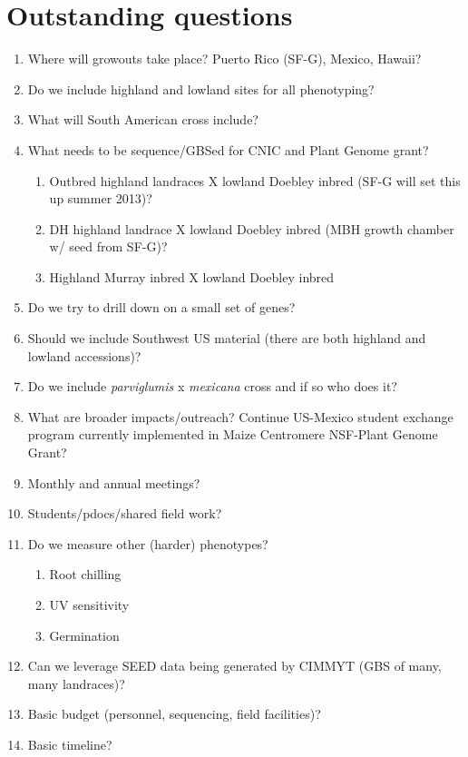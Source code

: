 \documentclass[]{article}
\begin{document}
\section*{Outstanding questions}
\begin{enumerate}
	\item Where will growouts take place?  Puerto Rico (SF-G), Mexico, Hawaii?
	\item Do we include highland and lowland sites for all phenotyping?
	\item What will South American cross include? 
	\item What needs to be sequence/GBSed for CNIC and Plant Genome grant? 
	\begin{enumerate}
		\item Outbred highland landraces X lowland Doebley inbred (SF-G will set this up summer 2013)? 
		\item DH highland landrace X lowland Doebley inbred (MBH growth chamber w/ seed from SF-G)?
		\item Highland Murray inbred X lowland Doebley inbred
	\end{enumerate}
	\item Do we try to drill down on a small set of genes?
	\item Should we include Southwest US material (there are both highland and lowland accessions)?
	\item Do we include \emph{parviglumis} x \emph{mexicana} cross and if so who does it?
	\item What are broader impacts/outreach? Continue US-Mexico student exchange program currently implemented in Maize Centromere NSF-Plant Genome Grant?
	\item Monthly and annual meetings?
	\item Students/pdocs/shared field work?
	\item Do we measure other (harder) phenotypes?
		\begin{enumerate}
		\item Root chilling
		\item UV sensitivity
		\item Germination
		\end{enumerate}
	\item Can we leverage SEED data being generated by CIMMYT (GBS of many, many landraces)?
	\item Basic budget (personnel, sequencing, field facilities)?
	\item Basic timeline?

\end{enumerate}
\end{document}
